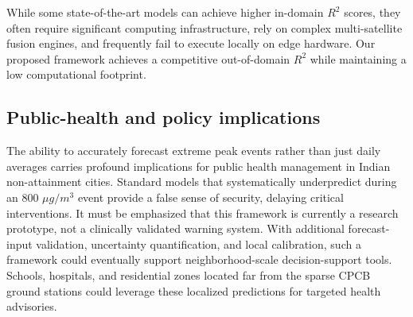 \begin{table}[h]
\centering
\caption{Comparison with existing air quality virtual sensing and forecasting literature.}
\label{tab:lit_comparison}
\end{table}

While some state-of-the-art models can achieve higher in-domain $R^2$ scores, they often require significant computing infrastructure, rely on complex multi-satellite fusion engines, and frequently fail to execute locally on edge hardware. Our proposed framework achieves a competitive out-of-domain $R^2$ while maintaining a low computational footprint.

\subsection{Public-health and policy implications}
The ability to accurately forecast extreme peak events rather than just daily averages carries profound implications for public health management in Indian non-attainment cities. Standard models that systematically underpredict during an 800 $\mu g/m^3$ event provide a false sense of security, delaying critical interventions. It must be emphasized that this framework is currently a research prototype, not a clinically validated warning system. With additional forecast-input validation, uncertainty quantification, and local calibration, such a framework could eventually support neighborhood-scale decision-support tools. Schools, hospitals, and residential zones located far from the sparse CPCB ground stations could leverage these localized predictions for targeted health advisories.

